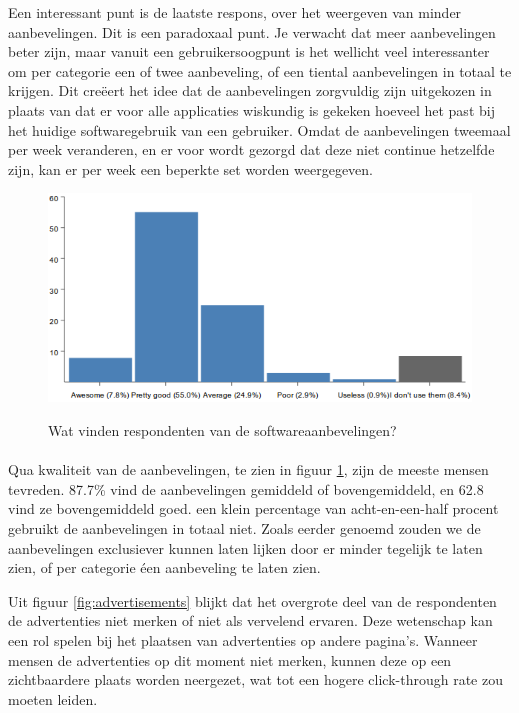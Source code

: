       Een interessant punt is de laatste respons, over het weergeven van minder aanbevelingen. Dit is een paradoxaal punt. Je verwacht dat meer aanbevelingen beter zijn, maar vanuit een gebruikersoogpunt is het wellicht veel interessanter om per categorie een of twee aanbeveling, of een tiental aanbevelingen in totaal te krijgen. Dit creëert het idee dat de aanbevelingen zorgvuldig zijn uitgekozen in plaats van dat er voor alle applicaties wiskundig is gekeken hoeveel het past bij het huidige softwaregebruik van een gebruiker. Omdat de aanbevelingen tweemaal per week veranderen, en er voor wordt gezorgd dat deze niet continue hetzelfde zijn, kan er per week een beperkte set worden weergegeven.

        \begin{figure}
          \begin{center}
          \caption{Wat vinden respondenten van de softwareaanbevelingen?}
            \includegraphics[width=\textwidth]{../images/enquete/think-of-recommendations}
          \label{fig:recommendations}
          \end{center}
        \end{figure}

      \paragraph{}Qua kwaliteit van de aanbevelingen, te zien in figuur \ref{fig:recommendations}, zijn de meeste mensen tevreden. 87.7\% vind de aanbevelingen gemiddeld of bovengemiddeld, en 62.8 vind ze bovengemiddeld goed. een klein percentage van acht-en-een-half procent gebruikt de aanbevelingen in totaal niet. Zoals eerder genoemd zouden we de aanbevelingen exclusiever kunnen laten lijken door er minder tegelijk te laten zien, of per categorie éen aanbeveling te laten zien.

      Uit figuur \ref{fig:advertisements} blijkt dat het overgrote deel van de respondenten de advertenties niet merken of niet als vervelend ervaren. Deze wetenschap kan een rol spelen bij het plaatsen van advertenties op andere pagina's. Wanneer mensen de advertenties op dit moment niet merken, kunnen deze op een zichtbaardere plaats worden neergezet, wat tot een hogere click-through rate zou moeten leiden.

